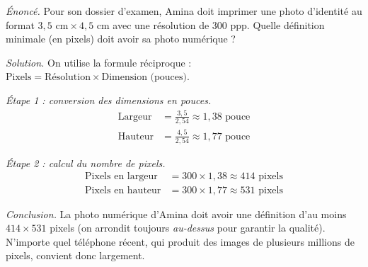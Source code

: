 \documentclass[11pt]{article}
\begin{document}
\begin{exoresolu}
\emph{Énoncé.} Pour son dossier d'examen, Amina doit imprimer une photo d'identité au format $3{,}5 \text{ cm} \times 4{,}5 \text{ cm}$ avec une résolution de $300$ ppp. Quelle définition minimale (en pixels) doit avoir sa photo numérique ?

\tcblower
\emph{Solution.} On utilise la formule réciproque : $\text{Pixels} = \text{Résolution} \times \text{Dimension (pouces)}$.

\emph{Étape 1 : conversion des dimensions en pouces.}
\begin{align*}
\text{Largeur} &= \frac{3{,}5}{2{,}54} \approx 1{,}38 \text{ pouce} \\
\text{Hauteur} &= \frac{4{,}5}{2{,}54} \approx 1{,}77 \text{ pouce}
\end{align*}

\emph{Étape 2 : calcul du nombre de pixels.}
\begin{align*}
\text{Pixels en largeur} &= 300 \times 1{,}38 \approx 414 \text{ pixels} \\
\text{Pixels en hauteur} &= 300 \times 1{,}77 \approx 531 \text{ pixels}
\end{align*}

\emph{Conclusion.} La photo numérique d'Amina doit avoir une définition d'au moins $414 \times 531$ pixels (on arrondit toujours \emph{au-dessus} pour garantir la qualité). N'importe quel téléphone récent, qui produit des images de plusieurs millions de pixels, convient donc largement.
\end{exoresolu}
\end{document}
